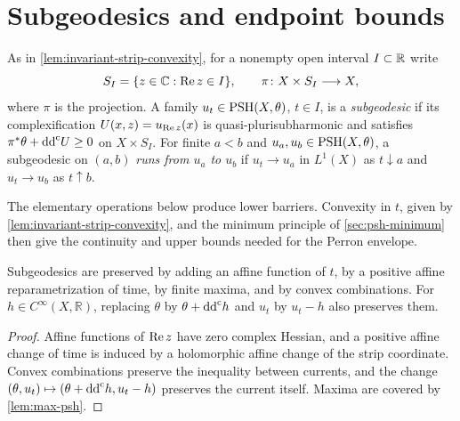 \section{Subgeodesics and endpoint bounds}\label{sec:strip-positivity}

As in \cref{lem:invariant-strip-convexity}, for a nonempty open interval $I\subset\mathbb R$ write
\[
 S_I=\{z\in\mathbb C:\operatorname{Re} z\in I\},\qquad
 \pi\colon X\times S_I\longrightarrow X,
\]
where $\pi$ is the projection. A family $u_t\in\mathrm{PSH}(X,\theta)$, $t\in I$, is a \emph{subgeodesic} if its complexification $U(x,z)=u_{\operatorname{Re} z}(x)$ is quasi-plurisubharmonic and satisfies $\pi^*\theta+\mathrm{dd}^{\mathrm{c}} U\geq0$ on $X\times S_I$. For finite $a<b$ and $u_a,u_b\in\mathrm{PSH}(X,\theta)$, a subgeodesic on $(a,b)$ \emph{runs from $u_a$ to $u_b$} if $u_t\to u_a$ in $L^1(X)$ as $t\downarrow a$ and $u_t\to u_b$ as $t\uparrow b$.

The elementary operations below produce lower barriers. Convexity in $t$, given by \cref{lem:invariant-strip-convexity}, and the minimum principle of \cref{sec:psh-minimum} then give the continuity and upper bounds needed for the Perron envelope.

\begin{proposition}\label{prop:hermitian-subgeodesic-calculus}
Subgeodesics are preserved by adding an affine function of $t$, by a positive affine reparametrization of time, by finite maxima, and by convex combinations. For $h\in C^\infty(X,\mathbb R)$, replacing $\theta$ by $\theta+\mathrm{dd}^{\mathrm{c}} h$ and $u_t$ by $u_t-h$ also preserves them.
\end{proposition}
\begin{proof}
Affine functions of $\operatorname{Re} z$ have zero complex Hessian, and a positive affine change of time is induced by a holomorphic affine change of the strip coordinate. Convex combinations preserve the inequality between currents, and the change $(\theta,u_t)\mapsto(\theta+\mathrm{dd}^{\mathrm{c}} h,u_t-h)$ preserves the current itself. Maxima are covered by \cref{lem:max-psh}.
\end{proof}

